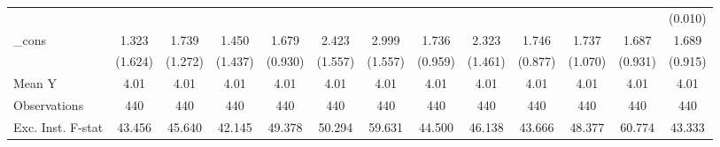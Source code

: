 {\begin{tabular}{l*{12}{c}}
            &                     &                     &                     &                     &                     &                     &                     &                     &                     &                     &                     &     (0.010)         \\
\addlinespace
\_cons      &       1.323         &       1.739         &       1.450         &       1.679\sym{*}  &       2.423         &       2.999\sym{*}  &       1.736\sym{*}  &       2.323         &       1.746\sym{*}  &       1.737         &       1.687\sym{*}  &       1.689\sym{*}  \\
            &     (1.624)         &     (1.272)         &     (1.437)         &     (0.930)         &     (1.557)         &     (1.557)         &     (0.959)         &     (1.461)         &     (0.877)         &     (1.070)         &     (0.931)         &     (0.915)         \\
\midrule
Mean Y      &        4.01         &        4.01         &        4.01         &        4.01         &        4.01         &        4.01         &        4.01         &        4.01         &        4.01         &        4.01         &        4.01         &        4.01         \\
Observations&         440         &         440         &         440         &         440         &         440         &         440         &         440         &         440         &         440         &         440         &         440         &         440         \\
Exc. Inst. F-stat&      43.456         &      45.640         &      42.145         &      49.378         &      50.294         &      59.631         &      44.500         &      46.138         &      43.666         &      48.377         &      60.774         &      43.333         \\
\bottomrule
\end{tabular}
}
